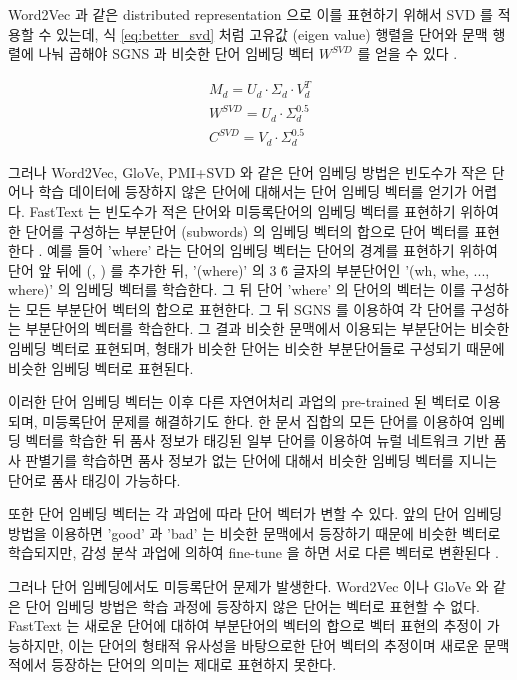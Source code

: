 \documentclass[oneside, ko,phd]{snuthesis_utf8_kor}
\begin{document}
Word2Vec 과 같은 distributed representation 으로 이를 표현하기 위해서 SVD 를 적용할 수 있는데, 식 \ref{eq:better_svd} 처럼 고유값 (eigen value) 행렬을 단어와 문맥 행렬에 나눠 곱해야 SGNS 과 비슷한 단어 임베딩 벡터 $W^{SVD}$ 를 얻을 수 있다 \cite{levy2015improving}.

\begin{equation}
  \label{eq:better_svd}
  \begin{aligned}
  M_d = U_d \cdot \Sigma_d \cdot V_d^T \\
  W^{SVD} = U_d \cdot \Sigma_d^{0.5} \\
  C^{SVD} = V_d \cdot \Sigma_d^{0.5}
  \end{aligned}
\end{equation}


그러나 Word2Vec, GloVe, PMI+SVD 와 같은 단어 임베딩 방법은 빈도수가 작은 단어나 학습 데이터에 등장하지 않은 단어에 대해서는 단어 임베딩 벡터를 얻기가 어렵다.
FastText 는 빈도수가 적은 단어와 미등록단어의 임베딩 벡터를 표현하기 위하여 한 단어를 구성하는 부분단어 (subwords) 의 임베딩 벡터의 합으로 단어 벡터를 표현한다 \cite{bojanowski2017enriching}.
예를 들어 'where' 라는 단어의 임베딩 벡터는 단어의 경계를 표현하기 위하여 단어 앞 뒤에 (, ) 를 추가한 뒤, '(where)' 의 3 \~ 6 글자의 부분단어인 '(wh, whe, ..., where)' 의 임베딩 벡터를 학습한다.
그 뒤 단어 'where' 의 단어의 벡터는 이를 구성하는 모든 부분단어 벡터의 합으로 표현한다.
그 뒤 SGNS 를 이용하여 각 단어를 구성하는 부분단어의 벡터를 학습한다.
그 결과 비슷한 문맥에서 이용되는 부분단어는 비슷한 임베딩 벡터로 표현되며, 형태가 비슷한 단어는 비슷한 부분단어들로 구성되기 때문에 비슷한 임베딩 벡터로 표현된다.

이러한 단어 임베딩 벡터는 이후 다른 자연어처리 과업의 pre-trained 된 벡터로 이용되며, 미등록단어 문제를 해결하기도 한다.
한 문서 집합의 모든 단어를 이용하여 임베딩 벡터를 학습한 뒤 품사 정보가 태깅된 일부 단어를 이용하여 뉴럴 네트워크 기반 품사 판별기를 학습하면 품사 정보가 없는 단어에 대해서 비슷한 임베딩 벡터를 지니는 단어로 품사 태깅이 가능하다.

또한 단어 임베딩 벡터는 각 과업에 따라 단어 벡터가 변할 수 있다.
앞의 단어 임베딩 방법을 이용하면 'good' 과 'bad' 는 비슷한 문맥에서 등장하기 때문에 비슷한 벡터로 학습되지만, 감성 분삭 과업에 의하여 fine-tune 을 하면 서로 다른 벡터로 변환된다 \cite{kim2014convolutional, joulin2016bag}.

그러나 단어 임베딩에서도 미등록단어 문제가 발생한다.
Word2Vec 이나 GloVe 와 같은 단어 임베딩 방법은 학습 과정에 등장하지 않은 단어는 벡터로 표현할 수 없다.
FastText 는 새로운 단어에 대하여 부분단어의 벡터의 합으로 벡터 표현의 추정이 가능하지만, 이는 단어의 형태적 유사성을 바탕으로한 단어 벡터의 추정이며 새로운 문맥적에서 등장하는 단어의 의미는 제대로 표현하지 못한다.
\end{document}
